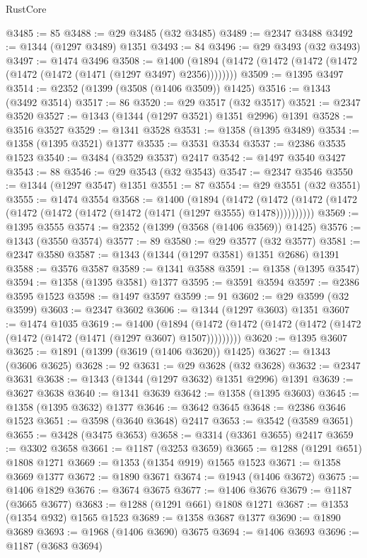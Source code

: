 \begin{lexlean}{RustCore}
\begin{coremodule}
{\begin{coremodule}
{{{{{{{{{{{{{{{{{{{{{{{{{{{{{{{{{{{{{{{{{{{{@3485 := 85
@3488 := @29 @3485 (@32 @3485)
@3489 := @2347 @3488
@3492 := @1344 (@1297 @3489) @1351
@3493 := 84
@3496 := @29 @3493 (@32 @3493)
@3497 := @1474 @3496
@3508 := @1400 (@1894 (@1472 (@1472 (@1472 (@1472 (@1472 (@1472 (@1471 (@1297 @3497) @2356))))))))
@3509 := @1395 @3497
@3514 := @2352 (@1399 (@3508 (@1406 @3509)) @1425)
@3516 := @1343 (@3492 @3514)
@3517 := 86
@3520 := @29 @3517 (@32 @3517)
@3521 := @2347 @3520
@3527 := @1343 (@1344 (@1297 @3521) @1351 @2996) @1391
@3528 := @3516 @3527
@3529 := @1341 @3528
@3531 := @1358 (@1395 @3489)
@3534 := @1358 (@1395 @3521) @1377
@3535 := @3531 @3534
@3537 := @2386 @3535 @1523
@3540 := @3484 (@3529 @3537) @2417
@3542 := @1497 @3540 @3427
@3543 := 88
@3546 := @29 @3543 (@32 @3543)
@3547 := @2347 @3546
@3550 := @1344 (@1297 @3547) @1351
@3551 := 87
@3554 := @29 @3551 (@32 @3551)
@3555 := @1474 @3554
@3568 := @1400
    (@1894
      (@1472 (@1472 (@1472 (@1472 (@1472 (@1472 (@1472 (@1472 (@1471 (@1297 @3555) @1478))))))))))
@3569 := @1395 @3555
@3574 := @2352 (@1399 (@3568 (@1406 @3569)) @1425)
@3576 := @1343 (@3550 @3574)
@3577 := 89
@3580 := @29 @3577 (@32 @3577)
@3581 := @2347 @3580
@3587 := @1343 (@1344 (@1297 @3581) @1351 @2686) @1391
@3588 := @3576 @3587
@3589 := @1341 @3588
@3591 := @1358 (@1395 @3547)
@3594 := @1358 (@1395 @3581) @1377
@3595 := @3591 @3594
@3597 := @2386 @3595 @1523
@3598 := @1497 @3597
@3599 := 91
@3602 := @29 @3599 (@32 @3599)
@3603 := @2347 @3602
@3606 := @1344 (@1297 @3603) @1351
@3607 := @1474 @1035
@3619 := @1400
    (@1894 (@1472 (@1472 (@1472 (@1472 (@1472 (@1472 (@1472 (@1471 (@1297 @3607) @1507)))))))))
@3620 := @1395 @3607
@3625 := @1891 (@1399 (@3619 (@1406 @3620)) @1425)
@3627 := @1343 (@3606 @3625)
@3628 := 92
@3631 := @29 @3628 (@32 @3628)
@3632 := @2347 @3631
@3638 := @1343 (@1344 (@1297 @3632) @1351 @2996) @1391
@3639 := @3627 @3638
@3640 := @1341 @3639
@3642 := @1358 (@1395 @3603)
@3645 := @1358 (@1395 @3632) @1377
@3646 := @3642 @3645
@3648 := @2386 @3646 @1523
@3651 := @3598 (@3640 @3648) @2417
@3653 := @3542 (@3589 @3651)
@3655 := @3428 (@3475 @3653)
@3658 := @3314 (@3361 @3655) @2417
@3659 := @3302 @3658
@3661 := @1187 (@3253 @3659)
@3665 := @1288 (@1291 @651) @1808 @1271
@3669 := @1353 (@1354 @919) @1565 @1523
@3671 := @1358 @3669 @1377
@3672 := @1890 @3671
@3674 := @1943 (@1406 @3672)
@3675 := @1406 @1829
@3676 := @3674 @3675
@3677 := @1406 @3676
@3679 := @1187 (@3665 @3677)
@3683 := @1288 (@1291 @661) @1808 @1271
@3687 := @1353 (@1354 @932) @1565 @1523
@3689 := @1358 @3687 @1377
@3690 := @1890 @3689
@3693 := @1968 (@1406 @3690) @3675
@3694 := @1406 @3693
@3696 := @1187 (@3683 @3694)
}}}}}}}}}}}}}}}}}}}}}}}}}}}}}}}}}}}}}}}}}}}}
\end{coremodule}}
\end{coremodule}
\end{lexlean}
